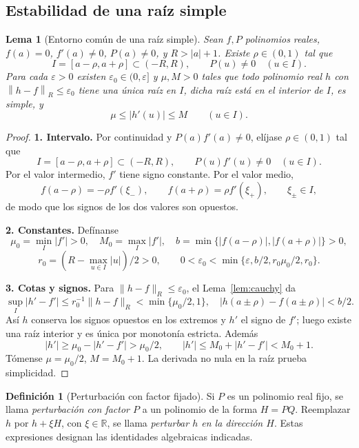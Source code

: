 \documentclass[11pt,a4paper]{article}
\numberwithin{equation}{section}
\newtheorem{lemma}[theorem]{Lema}
\theoremstyle{definition}
\newtheorem{definition}[theorem]{Definición}
\theoremstyle{remark}
\newcommand{\R}{\mathbb R}
\newcommand{\norm}[1]{\left\lVert#1\right\rVert}
\newcommand{\paso}[1]{\par\smallskip\noindent\textbf{#1}\quad}
\begin{document}
\subsection{Estabilidad de una raíz simple}
\begin{lemma}[Entorno común de una raíz simple]\label{lem:rootball}
Sean $f,P$ polinomios reales, $f(a)=0$, $f'(a)\ne0$, $P(a)\ne0$, y $R>|a|+1$. Existe $\rho\in(0,1)$ tal que
\[
I=[a-\rho,a+\rho]\subset(-R,R),\qquad P(u)\ne0\quad(u\in I).
\]
Para cada $\varepsilon>0$ existen $\varepsilon_0\in(0,\varepsilon]$ y $\mu,M>0$ tales que todo polinomio real $h$ con $\norm{h-f}_R\le\varepsilon_0$ tiene una única raíz en $I$, dicha raíz está en el interior de $I$, es simple, y
\begin{equation}\label{eq:rootbounds}
\mu\le |h'(u)|\le M\qquad(u\in I).
\end{equation}
\end{lemma}
\begin{proof}
\paso{1. Intervalo.}
Por continuidad y $P(a)f'(a)\ne0$, elíjase $\rho\in(0,1)$ tal que
\[
I=[a-\rho,a+\rho]\subset(-R,R),\qquad P(u)f'(u)\ne0\quad(u\in I).
\]
Por el valor intermedio, $f'$ tiene signo constante. Por el valor medio,
\[
f(a-\rho)=-\rho f'(\xi_-),\qquad f(a+\rho)=\rho f'(\xi_+),\qquad\xi_\pm\in I,
\]
de modo que los signos de los dos valores son opuestos.
\paso{2. Constantes.}
Defínanse
\[
\mu_0=\min_I|f'|>0,\quad M_0=\max_I|f'|,\quad
b=\min\{|f(a-\rho)|,|f(a+\rho)|\}>0,
\]
\[
r_0=(R-\max_{u\in I}|u|)/2>0,\qquad
0<\varepsilon_0<\min\{\varepsilon,b/2,r_0\mu_0/2,r_0\}.
\]
\paso{3. Cotas y signos.}
Para $\|h-f\|_R\le\varepsilon_0$, el Lema~\ref{lem:cauchy} da
\[
\sup_I|h'-f'|\le r_0^{-1}\|h-f\|_R<\min\{\mu_0/2,1\},
\quad |h(a\pm\rho)-f(a\pm\rho)|<b/2.
\]
Así $h$ conserva los signos opuestos en los extremos y $h'$ el signo de $f'$; luego existe una raíz interior y es única por monotonía estricta. Además
\[
|h'|\ge\mu_0-|h'-f'|>\mu_0/2,\qquad
|h'|\le M_0+|h'-f'|<M_0+1.
\]
Tómense $\mu=\mu_0/2$, $M=M_0+1$. La derivada no nula en la raíz prueba simplicidad.
\end{proof}

\begin{definition}[Perturbación con factor fijado]\label{def:perturbation}
Si $P$ es un polinomio real fijo, se llama \emph{perturbación con factor $P$} a un polinomio de la forma $H=PQ$. Reemplazar $h$ por $h+\xi H$, con $\xi\in\R$, se llama \emph{perturbar $h$ en la dirección $H$}. Estas expresiones designan las identidades algebraicas indicadas.
\end{definition}
\end{document}
